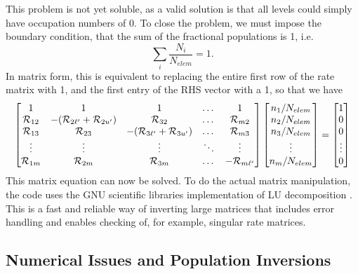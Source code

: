 %
This problem is not yet soluble, as a valid solution is that all levels 
could simply have occupation numbers of $0$. To close the problem, we must impose the boundary condition, that the sum of the fractional populations is 1, i.e.
%
\begin{equation}
\sum_i \frac{N_i}{N_{elem}} = 1.
\end{equation}
In matrix form, this is equivalent to replacing the entire first row
of the rate matrix with 1, and the first entry of the RHS vector with a 1,
so that we have
%
\begin{equation}
\begin{bmatrix}
    1  & 1 & 1 & \dots & 1\\
    {\cal R}_{12} & -({\cal R}_{2{\ell^\prime}} + {\cal R}_{2{u^\prime}}) & {\cal R}_{32} & \dots & {\cal R}_{m2} \\
    {\cal R}_{13}  & {\cal R}_{23} & -({\cal R}_{3{\ell^\prime}} + {\cal R}_{3{u^\prime}}) & \dots & {\cal R}_{m3} \\
    \vdots & \vdots & \vdots & \ddots & \vdots \\
    {\cal R}_{1m}      & {\cal R}_{2m} & {\cal R}_{3m} & \dots & -{\cal R}_{m{\ell^\prime}}
\end{bmatrix}
\begin{bmatrix}
    n_1 / N_{elem} \\
    n_2 / N_{elem} \\
    n_3 / N_{elem} \\
    \vdots         \\
    n_m / N_{elem} 
\end{bmatrix}
=
\begin{bmatrix}
    1 \\
    0 \\
    0 \\
    \vdots \\
    0
\end{bmatrix}
\end{equation}
%
This matrix equation can now be solved.
To do the actual matrix manipulation, the code uses the GNU 
scientific libraries \citep[GSL;][]{GSL} implementation of
LU decomposition \citep{turing}. This is a fast and reliable way of
inverting large matrices that includes error handling and enables
checking of, for example, singular rate matrices.

\subsection{Numerical Issues and Population Inversions}
\label{sec:numerical_matom}

